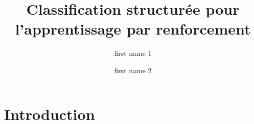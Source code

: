 \documentclass[english,utf8]{./hermes-journal}
\title{Classification structurée pour l'apprentissage par renforcement}
\author[1]{first name 1}{last name 1}
\author[2]{first name 2}{last name 2}
\begin{document}
\maketitle

\newpage
\cite{Ng:2000}

\section{Introduction}



\end{document}
